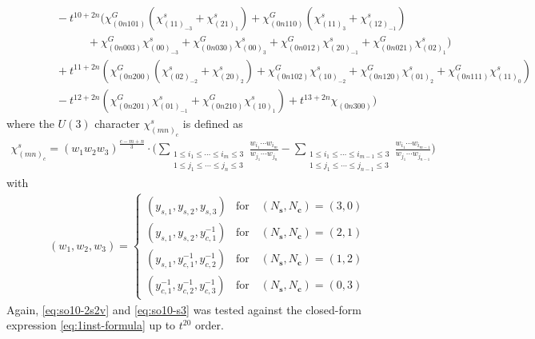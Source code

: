 \documentclass[letterpaper, 11pt]{article}
\newcommand{\nn}{\nonumber}
\begin{document}
{\begin{align}
&\qquad \quad \ -t^{10+2n}(\chi^G_{(0n101)}(\chi^s_{(11)_{-3}}+\chi^s_{(21)_1})+\chi^G_{(0n110)}(\chi^s_{(11)_3}+\chi^s_{(12)_{-1}})\nn\\
& \qquad \qquad\qquad+\chi^G_{(0n003)}\chi^s_{(00)_{-3}}+\chi^G_{(0n030)}\chi^s_{(00)_3}+\chi^G_{(0n012)}\chi^s_{(20)_{-1}}+\chi^G_{(0n021)}\chi^s_{(02)_1})\nn\\
&\qquad \quad \ +t^{11+2n}(\chi^G_{(0n200)}(\chi^s_{(02)_{-2}}+\chi^s_{(20)_2})+\chi^G_{(0n102)}\chi^s_{(10)_{-2}}+\chi^G_{(0n120)}\chi^s_{(01)_2}+\chi^G_{(0n111)}\chi^s_{(11)_0})\nn\\
&\qquad \quad \ -t^{12+2n}(\chi^G_{(0n201)}\chi^s_{(01)_{-1}}+\chi^G_{(0n210)}\chi^s_{(10)_1})+t^{13+2n}\chi_{(0n300)}\Big)\nn
\end{align}
where the $U(3)$ character $\chi^s_{(mn)_c}$ is defined as
\begin{align}
  \label{eq:u3-flavor-char}
  \chi^s_{(mn)_c} =
    (w_1 w_2w_3)^{\frac{c-m+n}{3}} \cdot\bigg( \sum_{\substack{1\leq i_1\leq\cdots\leq i_m\leq3\\1\leq j_1\leq\cdots\leq j_n\leq 3}}\frac{w_{i_1}\cdots w_{i_m}}{w_{j_1}\cdots w_{j_n}}-\sum_{\substack{1\leq i_1\leq\cdots\leq i_{m-1}\leq3\\1\leq j_1\leq\cdots\leq j_{n-1}\leq 3}}\frac{w_{i_1}\cdots w_{i_{m-1}}}{w_{j_1}\cdots w_{j_{n-1}}}\bigg)
\end{align}
with
\begin{align}
(w_1,w_2,w_3)=
\begin{cases}
(y_{s,1},y_{s,2},y_{s,3}) & \text{for}\quad (N_\mathbf{s}, N_\mathbf{c})=(3,0)\\
(y_{s,1},y_{s,2},y_{c,1}^{-1}) & \text{for}\quad (N_\mathbf{s}, N_\mathbf{c})=(2,1)\\
(y_{s,1},y_{c,1}^{-1},y_{c,2}^{-1}) & \text{for}\quad (N_\mathbf{s}, N_\mathbf{c})=(1,2)\\
(y_{c,1}^{-1},y_{c,2}^{-1},y_{c,3}^{-1}) & \text{for}\quad (N_\mathbf{s}, N_\mathbf{c})=(0,3)
\end{cases}
\end{align}
Again, \eqref{eq:so10-2s2v} and \eqref{eq:so10-s3} was tested against the closed-form expression \eqref{eq:1inst-formula} up to $t^{20}$ order.


}
\end{document}
